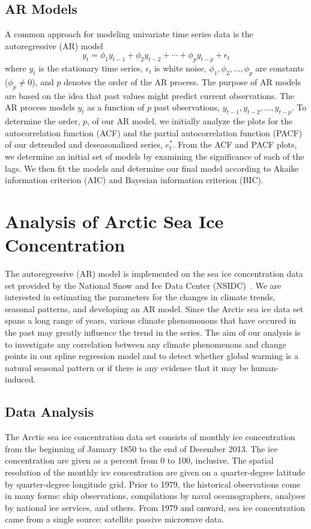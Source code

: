 \documentclass[12pt]{article}
\begin{document}
\subsection{AR Models}
A common approach for modeling univariate time series data is the autoregressive (AR) model
$$y_t = \phi_{1}y_{t-1} + \phi_{2}y_{t-2} + \cdots + \phi_{p}y_{t-p} + \epsilon_t$$
where $y_t$ is the stationary time series, $\epsilon_t$ is white noise, $\phi_1, \phi_2, \dots, \phi_p$ are constants ($\phi_p \neq 0$), and $p$ denotes the order of the AR process. The purpose of AR models are based on the idea that past values might predict current observations. The AR process models $y_t$ as a function of $p$ past observations, $y_{t-1}, y_{t-2}, \dots, y_{t-p}$. To determine the order, $p$, of our AR model, we initially analyze the plots for the autocorrelation function (ACF) and the partial autocorrelation function (PACF) of our detrended and deseasonalized series, $e^{*}_{t}$. From the ACF and PACF plots, we determine an initial set of models by examining the significance of each of the lags. We then fit the models and determine our final model according to Akaike information criterion (AIC) and Bayesian information criterion (BIC).


\section{Analysis of Arctic Sea Ice Concentration}
The autoregressive (AR) model is implemented on the sea ice concentration data set provided by the National Snow and Ice Data Center (NSIDC)~\citep{data}. We are interested in estimating the parameters for the changes in climate trends, seasonal patterns, and developing an AR model. Since the Arctic sea ice data set spans a long range of years, various climate phenomonons that have occured in the past may greatly influence the trend in the series. The aim of our analysis is to investigate any correlation between any climate phenomenons and change points in our spline regression model and to detect whether global warming is a natural seasonal pattern or if there is any evidence that it may be human-induced.

\subsection{Data Analysis}
The Arctic sea ice concentration data set consists of monthly ice concentration from the beginning of January 1850 to the end of December 2013. The ice concentration are given as a percent from 0 to 100, inclusive. The spatial resolution of the monthly ice concentration are given on a quarter-degree latitude by quarter-degree longitude grid. Prior to 1979, the historical observations come in many forms: ship observations, compilations by naval oceanographers, analyses by national ice services, and others. From 1979 and onward, sea ice concentration came from a single source: satellite passive microwave data.
\end{document}
